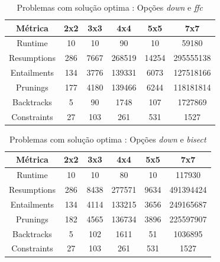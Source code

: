 \documentclass{llncs}
\begin{document}
\setlength{\tabcolsep}{12pt}
\begin{table}[ht] 
\caption{Problemas com solu\c{c}\~{a}o optima : Op\c{c}\~{o}es \emph{down} e \emph{ffc}} %
\centering %
\begin{tabular}{c c c c c c} %
\hline\hline %

M\'{e}trica & 2x2 & 3x3 & 4x4 & 5x5 & 7x7\\ [0.5ex] %
\hline %
Runtime & 10 & 10 & 90 & 10 & 59180 \\
Resumptions & 286 & 7667 & 268519 & 14254 & 295555138 \\
Entailments & 134 & 3776 & 139331 & 6073 & 127518166 \\
Prunings & 177 & 4180 & 139466 & 6244 & 118181814 \\
Backtracks & 5 & 90 & 1748 & 107 & 1727869 \\
Constraints & 27 & 103 & 261 & 531 & 1527 \\[1 ex]
\hline %
\end{tabular} 
\label{tabela:3} %
\end{table}

\setlength{\tabcolsep}{12pt}
\begin{table}[ht] 
\caption{Problemas com solu\c{c}\~{a}o optima : Op\c{c}\~{o}es \emph{down} e \emph{bisect}} %
\centering %
\begin{tabular}{c c c c c c} %
\hline\hline %

M\'{e}trica & 2x2 & 3x3 & 4x4 & 5x5 & 7x7\\ [0.5ex] %
\hline %
Runtime & 10 & 10 & 80 & 10 & 117930 \\
Resumptions & 286 & 8438 & 277571 & 9634 & 491394424 \\
Entailments & 134 & 4114 & 133215 & 3656 & 249165687 \\
Prunings & 182 & 4565 & 136734 & 3896 & 225597907 \\
Backtracks & 5 & 102 & 1611 & 51 & 1036895 \\
Constraints & 27 & 103 & 261 & 531 & 1527 \\[1 ex]
\hline %
\end{tabular} 
\label{tabela:4} %
\end{table}
\end{document}
